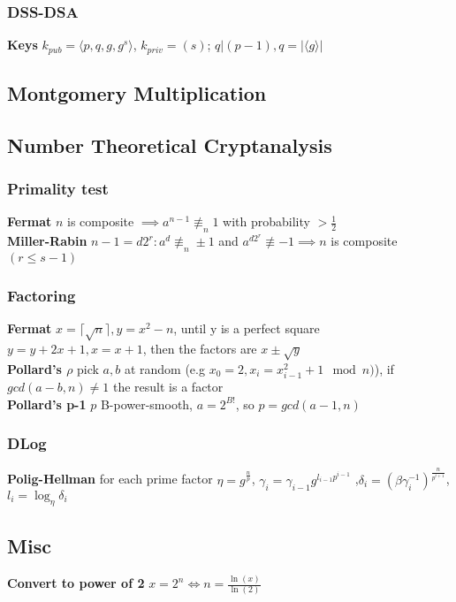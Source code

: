 \documentclass[twoside, 11pt]{article}
\begin{document}
            \subsubsection*{DSS-DSA}
                \textbf{Keys} $k_{pub} = \langle p, q, g, g^{s}\rangle$, $k_{priv} = (s)$; $q | (p-1), q = |\langle g \rangle|$     

        \subsection*{Montgomery Multiplication}

        \subsection*{Number Theoretical Cryptanalysis}
            \subsubsection*{Primality test}
                \textbf{Fermat} $n$ is composite $\implies a^{n-1} \not\equiv_{n} 1$ with probability $> \frac{1}{2}$ \\ 
                \textbf{Miller-Rabin} $n-1=d2^{r}: a^{d} \not\equiv_{n} \pm 1$ and $a^{d2^{r}} \not\equiv -1 \implies n$ is composite $(r \leqslant s-1)$\\
            \subsubsection*{Factoring}
                \textbf{Fermat} $x = \lceil \sqrt{n} \rceil, y=x^{2}-n$, until y is a perfect square $y=y+2x+1, x = x+1$, then the factors are $x \pm \sqrt{y}$ \\
                \textbf{Pollard's \boldmath $\rho$} pick $a, b$ at random (e.g $x_{0}=2, x_{i}=x_{i-1}^{2} + 1 \mod{n})$), if $gcd(a-b, n) \neq 1$ the result is a factor \\
                \textbf{Pollard's p-1} $p$ B-power-smooth, $a=2^{B!}$, so $p=gcd(a-1, n)$
            \subsubsection*{DLog}
                \textbf{Polig-Hellman} for each prime factor $\eta = g^{\frac{n}{p}}$, $\gamma_{i}=\gamma_{i-1}g^{l_{i-1}p^{i-1}}$ ,$\delta_{i}=(\beta\gamma_{i}^{-1})^{\frac{n}{p^{i+1}}}$, $l_{i}=\log_{\eta}\delta_{i}$

        \subsection*{Misc}
            \textbf{Convert to power of 2} $x = 2^{n} \Leftrightarrow n = \frac{\ln(x)}{\ln(2)}$ \\
\end{document}
